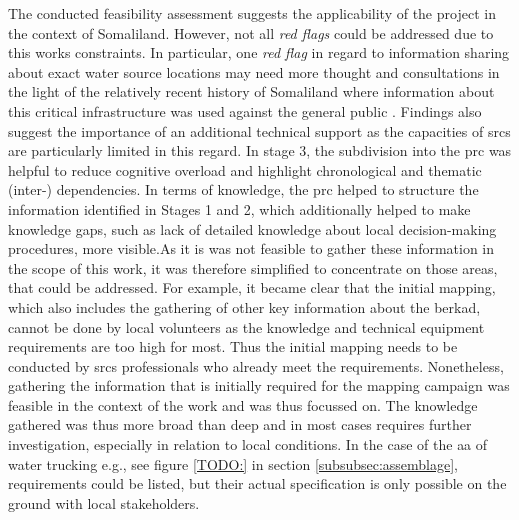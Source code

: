 The conducted feasibility assessment suggests the applicability of the project in the context of Somaliland. However, not all \textit{red flags} could be addressed due to this works constraints. In particular, one \textit{red flag} in regard to information sharing about exact water source locations may need more thought and consultations in the light of the relatively recent history of Somaliland where information about this critical infrastructure was used against the general public \autocite{republicofsomalilandSomalilandCountryProfile2021}. Findings also suggest the importance of an additional technical support as the capacities of \acrshort{srcs} are particularly limited in this regard.\newline
In stage 3, the subdivision into the \acrshort{prc} was helpful to reduce cognitive overload and highlight chronological and thematic (inter-) dependencies. In terms of knowledge, the \acrshort{prc} helped to structure the information identified in Stages 1 and 2,  which additionally helped to make knowledge gaps, such as lack of detailed knowledge about local decision-making procedures, more visible.As it is was not feasible to gather these information in the scope of this work, it was therefore simplified to concentrate on those areas, that could be addressed. For example, it became clear that the initial mapping, which also includes the gathering of other key information about the berkad, cannot be done by local volunteers as the knowledge and technical equipment requirements are too high for most. Thus the initial mapping needs to be conducted by \acrshort{srcs} professionals who already meet the requirements. Nonetheless, gathering the information that is initially required for the mapping campaign was feasible in the context of the work and was thus focussed on. The knowledge gathered was thus more broad than deep and in most cases requires further investigation, especially in relation to local conditions. In the case of the \acrshort{aa} of water trucking e.g., see figure \ref{TODO:} in section \ref{subsubsec:assemblage}, requirements could be listed, but their actual specification is only possible on the ground with local stakeholders.\newline
